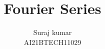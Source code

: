 \documentclass[journal,12pt,twocolumn]{IEEEtran}
\begin{document}
\let\StandardTheFigure\thefigure
\renewcommand{\thefigure}{\theproblem}



\def\putbox#1#2#3{\makebox[0in][l]{\makebox[#1][l]{}\raisebox{\baselineskip}[0in][0in]{\raisebox{#2}[0in][0in]{#3}}}}
     \def\rightbox#1{\makebox[0in][r]{#1}}
     \def\centbox#1{\makebox[0in]{#1}}
     \def\topbox#1{\raisebox{-\baselineskip}[0in][0in]{#1}}
     \def\midbox#1{\raisebox{-0.5\baselineskip}[0in][0in]{#1}}

\vspace{3cm}

\title{ 
Fourier Series
}


%
%
%

\author{ Suraj kumar\\
AI21BTECH11029%
}
% 
%
\end{document}
